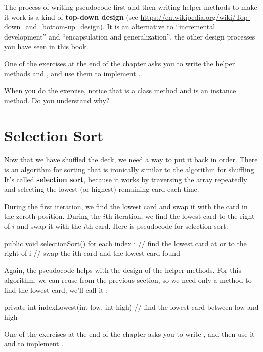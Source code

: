 The process of writing pseudocode first and then writing helper methods to make it work is a kind of {\bf top-down design} (see \url{https://en.wikipedia.org/wiki/Top-down_and_bottom-up_design}).
It is an alternative to ``incremental development'' and ``encapsulation and generalization'', the other design processes you have seen in this book.

One of the exercises at the end of the chapter asks you to write the helper methods  and , and use them to implement .

When you do the exercise, notice that  is a class method and  is an instance method.
Do you understand why?


\section{Selection Sort}
\label{sorting}


Now that we have shuffled the deck, we need a way to put it back in order.
There is an algorithm for sorting that is ironically similar to the algorithm for shuffling.
It's called {\bf selection sort}, because it works by traversing the array repeatedly and selecting the lowest (or highest) remaining card each time.

During the first iteration, we find the lowest card and swap it with the card in the zeroth position.
During the $i$th iteration, we find the lowest card to the right of $i$ and swap it with the $i$th card.
Here is pseudocode for selection sort:

\begin{code}
public void selectionSort() {
    for each index i {
        // find the lowest card at or to the right of i
        // swap the ith card and the lowest card found
    }
}
\end{code}

Again, the pseudocode helps with the design of the helper methods.
For this algorithm, we can reuse  from the previous section, so we need only a method to find the lowest card; we'll call it :

\begin{code}
private int indexLowest(int low, int high) {
    // find the lowest card between low and high
}
\end{code}

One of the exercises at the end of the chapter asks you to write , and then use it and  to implement .


